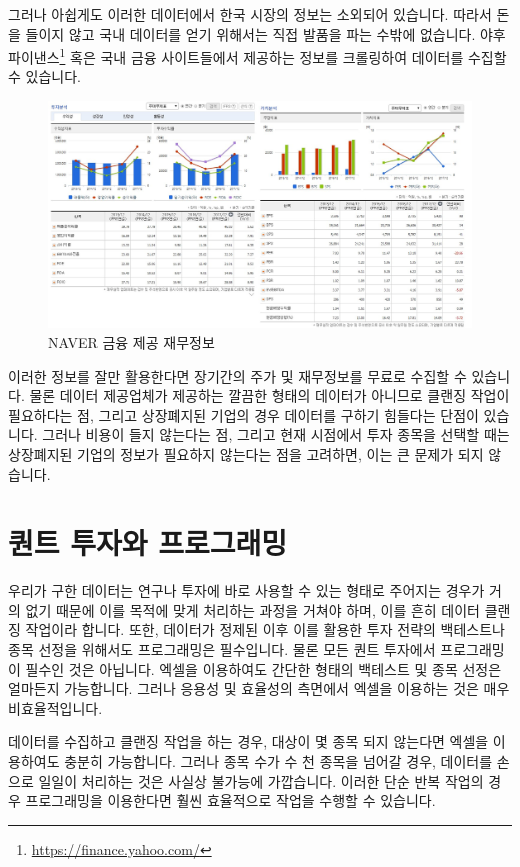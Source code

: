 \documentclass[12pt,]{book}
\let\rmarkdownfootnote\footnote%
\def\footnote{\protect\rmarkdownfootnote}
\begin{document}
그러나 아쉽게도 이러한 데이터에서 한국 시장의 정보는 소외되어 있습니다. 따라서 돈을 들이지 않고 국내 데이터를 얻기 위해서는 직접 발품을 파는 수밖에 없습니다. 야후 파이낸스\footnote{\url{https://finance.yahoo.com/}} 혹은 국내 금융 사이트들에서 제공하는 정보를 크롤링하여 데이터를 수집할 수 있습니다.

\begin{figure}[h]

{\centering \includegraphics[width=0.7\linewidth]{images/naver_finance_table} 

}

\caption{NAVER 금융 제공 재무정보}\label{fig:unnamed-chunk-2}
\end{figure}

이러한 정보를 잘만 활용한다면 장기간의 주가 및 재무정보를 무료로 수집할 수 있습니다. 물론 데이터 제공업체가 제공하는 깔끔한 형태의 데이터가 아니므로 클랜징 작업이 필요하다는 점, 그리고 상장폐지된 기업의 경우 데이터를 구하기 힘들다는 단점이 있습니다. 그러나 비용이 들지 않는다는 점, 그리고 현재 시점에서 투자 종목을 선택할 때는 상장폐지된 기업의 정보가 필요하지 않는다는 점을 고려하면, 이는 큰 문제가 되지 않습니다.

\hypertarget{section-3}{%
\section{퀀트 투자와 프로그래밍}\label{section-3}}

우리가 구한 데이터는 연구나 투자에 바로 사용할 수 있는 형태로 주어지는 경우가 거의 없기 때문에 이를 목적에 맞게 처리하는 과정을 거쳐야 하며, 이를 흔히 데이터 클랜징 작업이라 합니다. 또한, 데이터가 정제된 이후 이를 활용한 투자 전략의 백테스트나 종목 선정을 위해서도 프로그래밍은 필수입니다. 물론 모든 퀀트 투자에서 프로그래밍이 필수인 것은 아닙니다. 엑셀을 이용하여도 간단한 형태의 백테스트 및 종목 선정은 얼마든지 가능합니다. 그러나 응용성 및 효율성의 측면에서 엑셀을 이용하는 것은 매우 비효율적입니다.

데이터를 수집하고 클랜징 작업을 하는 경우, 대상이 몇 종목 되지 않는다면 엑셀을 이용하여도 충분히 가능합니다. 그러나 종목 수가 수 천 종목을 넘어갈 경우, 데이터를 손으로 일일이 처리하는 것은 사실상 불가능에 가깝습니다. 이러한 단순 반복 작업의 경우 프로그래밍을 이용한다면 훨씬 효율적으로 작업을 수행할 수 있습니다.
\end{document}
